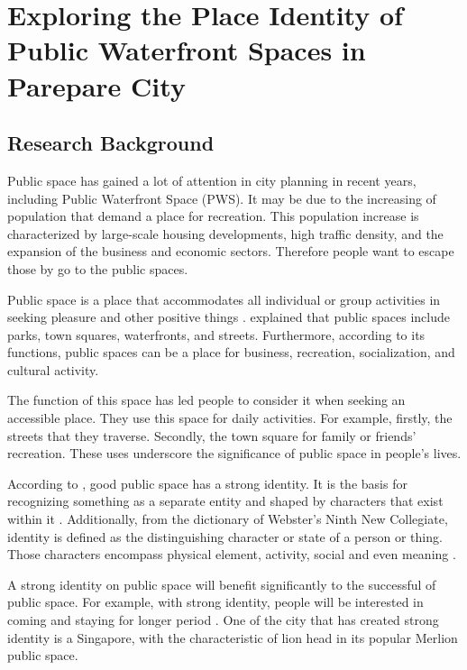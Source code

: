 \documentclass[draft, ../riset_senja.tex]{subfiles}
\begin{document}
\section{Exploring the Place Identity of Public Waterfront Spaces in Parepare City}%
\label{sec:Exploring the Place Identity of Public Waterfront Spaces in Parepare City}

\subsection{Research Background}%
\label{sub:ResearchBackground}

Public space has gained a lot of attention in city planning in recent years, including Public Waterfront Space (PWS). It may be due to the increasing of population that demand a place for recreation.
This population increase is characterized by large-scale housing developments, high traffic density, and the expansion of the business and economic sectors. Therefore people want to escape those by go to the public spaces.

Public space is a place that accommodates all individual or group activities in seeking pleasure and other positive things \citep{sadat2012}.
\cite{sadat2012} explained that public spaces include parks, town squares, waterfronts, and streets. Furthermore, according to its functions, public spaces can be a place for business, recreation, socialization, and cultural activity.

The function of this space has led people to consider it when seeking an accessible place. They use this space for daily activities. For example, firstly, the streets that they traverse. Secondly, the town square for family or friends' recreation. These uses underscore the significance of public space in people's lives.

According to \cite{hartanti2014}, good public space has a strong identity. It is the basis for recognizing something as a separate entity and shaped by characters that exist within it \citep{hartanti2014}.
Additionally, from the dictionary of Webster's Ninth New Collegiate, identity is defined as the distinguishing character or state of a person or thing.
Those characters encompass physical element, activity, social and even meaning \citep{hartanti2014, kaymaz2013}.

A strong identity on public space will benefit significantly to the successful of public space.
For example, with strong identity, people will be interested in coming and staying for longer period \citep{oktay2002}. One of the city that has created strong identity is a Singapore, with the characteristic of lion head in its popular Merlion public space.
\end{document}
